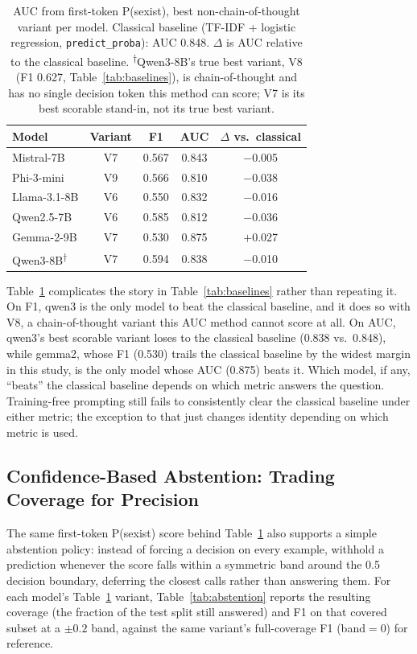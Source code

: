 \begin{table}[t]
\centering
\footnotesize
\caption{AUC from first-token P(sexist), best non-chain-of-thought
variant per model. Classical baseline (TF-IDF + logistic regression,
\texttt{predict\_proba}): AUC 0.848. $\Delta$ is AUC relative to the
classical baseline. \textsuperscript{$\dagger$}Qwen3-8B's true best
variant, V8 (F1 0.627, Table~\ref{tab:baselines}), is chain-of-thought
and has no single decision token this method can score; V7 is its best
scorable stand-in, not its true best variant.}
\label{tab:auc}
\begin{tabular}{lcccc}
\toprule
Model & Variant & F1 & AUC & $\Delta$ vs.\ classical \\
\midrule
Mistral-7B & V7 & 0.567 & 0.843 & $-$0.005 \\
Phi-3-mini & V9 & 0.566 & 0.810 & $-$0.038 \\
Llama-3.1-8B & V6 & 0.550 & 0.832 & $-$0.016 \\
Qwen2.5-7B & V6 & 0.585 & 0.812 & $-$0.036 \\
Gemma-2-9B & V7 & 0.530 & 0.875 & $+$0.027 \\
Qwen3-8B\textsuperscript{$\dagger$} & V7 & 0.594 & 0.838 & $-$0.010 \\
\bottomrule
\end{tabular}
\end{table}

Table~\ref{tab:auc} complicates the story in Table~\ref{tab:baselines}
rather than repeating it. On F1, qwen3 is the only model to beat the
classical baseline, and it does so with V8, a chain-of-thought variant
this AUC method cannot score at all. On AUC, qwen3's best scorable
variant loses to the classical baseline (0.838 vs.\ 0.848), while
gemma2, whose F1 (0.530) trails the classical baseline by the widest
margin in this study, is the only model whose AUC (0.875) beats it.
Which model, if any, ``beats'' the classical baseline depends on which
metric answers the question. Training-free prompting still fails to
consistently clear the classical baseline under either metric; the
exception to that just changes identity depending on which metric is
used.

\subsection{Confidence-Based Abstention: Trading Coverage for Precision}
\label{sec:results:abstention}

The same first-token P(sexist) score behind Table~\ref{tab:auc} also
supports a simple abstention policy: instead of forcing a decision on
every example, withhold a prediction whenever the score falls within a
symmetric band around the 0.5 decision boundary, deferring the closest
calls rather than answering them. For each model's Table~\ref{tab:auc}
variant, Table~\ref{tab:abstention} reports the resulting coverage (the
fraction of the test split still answered) and F1 on that covered subset
at a $\pm0.2$ band, against the same variant's full-coverage F1
(band$=$0) for reference.

